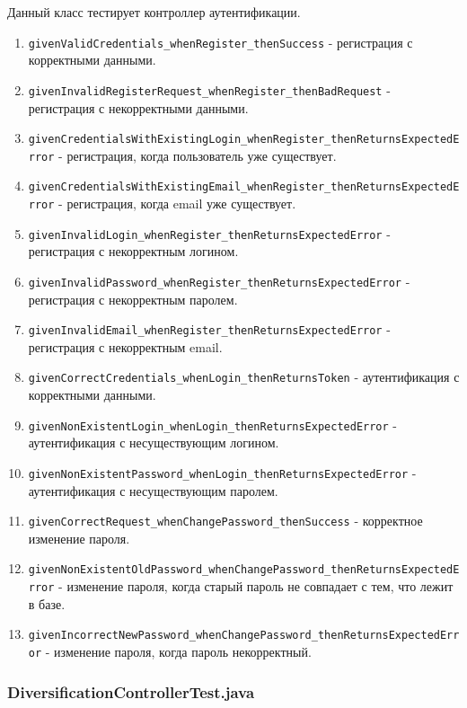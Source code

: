 \documentclass[a4paper, 14pt]{article}
\begin{document}
Данный класс тестирует контроллер аутентификации.

\begin{enumerate}
    \item \texttt{givenValidCredentials\_whenRegister\_thenSuccess} - регистрация с корректными данными.
    \item \texttt{givenInvalidRegisterRequest\_whenRegister\_thenBadRequest} - регистрация с некорректными данными.
    \item \texttt{givenCredentialsWithExistingLogin\_whenRegister\_thenReturnsExpectedError} - регистрация, когда пользователь уже существует.
    \item \texttt{givenCredentialsWithExistingEmail\_whenRegister\_thenReturnsExpectedError} - регистрация, когда email уже существует.
    \item \texttt{givenInvalidLogin\_whenRegister\_thenReturnsExpectedError} - регистрация с некорректным логином.
    \item \texttt{givenInvalidPassword\_whenRegister\_thenReturnsExpectedError} - регистрация с некорректным паролем.
    \item \texttt{givenInvalidEmail\_whenRegister\_thenReturnsExpectedError} - регистрация с некорректным email.
    \item \texttt{givenCorrectCredentials\_whenLogin\_thenReturnsToken} - аутентификация с корректными данными.
    \item \texttt{givenNonExistentLogin\_whenLogin\_thenReturnsExpectedError} - аутентификация с несуществующим логином.
    \item \texttt{givenNonExistentPassword\_whenLogin\_thenReturnsExpectedError} - аутентификация с несуществующим паролем.
    \item \texttt{givenCorrectRequest\_whenChangePassword\_thenSuccess} - корректное изменение пароля.
    \item \texttt{givenNonExistentOldPassword\_whenChangePassword\_thenReturnsExpectedError} - изменение пароля, когда старый пароль не совпадает с тем, что лежит в базе.
    \item \texttt{givenIncorrectNewPassword\_whenChangePassword\_thenReturnsExpectedError} - изменение пароля, когда пароль некорректный.
\end{enumerate}

\subsubsection{DiversificationControllerTest.java}
\end{document}
